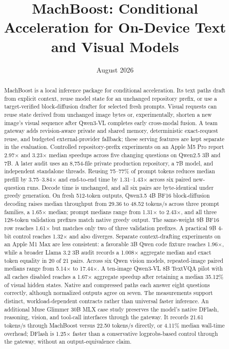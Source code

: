 \documentclass[11pt]{article}
\title{MachBoost: Conditional Acceleration for On-Device Text and Visual Models}
\author{}
\date{August 2026}
\begin{document}
\maketitle

\begin{abstract}
MachBoost is a local inference package for conditional acceleration. Its text paths draft from explicit context, reuse model state for an unchanged repository prefix, or use a target-verified block-diffusion drafter for selected fresh prompts. Visual requests can reuse state derived from unchanged image bytes or, experimentally, shorten a new image's visual sequence after Qwen3-VL completes early cross-modal fusion. A team gateway adds revision-aware private and shared memory, deterministic exact-request reuse, and budgeted external-provider fallback; these serving features are kept separate in the evaluation. Controlled repository-prefix experiments on an Apple M5 Pro report 2.97$\times$ and 3.23$\times$ median speedups across five changing questions on Qwen2.5 3B and 7B. A later audit uses an 8,754-file private production repository, a 7B model, and independent standalone threads. Reusing 75--77\% of prompt tokens reduces median prefill by 3.75--3.84$\times$ and end-to-end time by 1.31--1.43$\times$ across six paired new-question runs. Decode time is unchanged, and all six pairs are byte-identical under greedy generation. On fresh 512-token outputs, Qwen3.5 4B BF16 block-diffusion decoding raises median throughput from 29.36 to 48.52 tokens/s across three prompt families, a 1.65$\times$ median; prompt medians range from 1.31$\times$ to 2.43$\times$, and all three 128-token validation prefixes match native greedy output. The same-weight 9B BF16 row reaches 1.61$\times$ but matches only two of three validation prefixes. A practical 9B 4-bit control reaches 1.32$\times$ and also diverges. Separate context-drafting experiments on an Apple M1 Max are less consistent: a favorable 3B Qwen code fixture reaches 1.96$\times$, while a broader Llama 3.2 3B audit records a 1.008$\times$ aggregate median and exact token equality in 20 of 21 pairs. Across six Qwen vision models, repeated-image paired medians range from 5.14$\times$ to 17.44$\times$. A ten-image Qwen3-VL 8B TextVQA pilot with all caches disabled reaches a 1.67$\times$ aggregate speedup after retaining a median 35.12\% of visual hidden states. Native and compressed paths each answer eight questions correctly, although normalized outputs agree on seven. The measurements support distinct, workload-dependent contracts rather than universal faster inference.
An additional Muse Glimmer 30B MLX case study preserves the model's native DFlash, reasoning, vision, and tool-call interfaces through the gateway. It records 21.61 tokens/s through MachBoost versus 22.50 tokens/s directly, or 4.11\% median wall-time overhead; DFlash is 1.25$\times$ faster than a conservative logprobs-based control through the gateway, without an output-equivalence claim.
\end{abstract}
\end{document}

